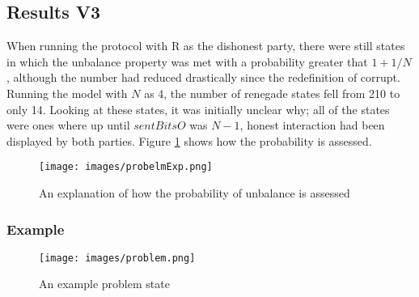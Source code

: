 \documentclass{l4proj}
\begin{document}
\subsection{Results V3}



When running the protocol with R as the dishonest party, there were still states in which the unbalance property was met with a probability greater that $1+1/N$, although the number had reduced drastically since the redefinition of corrupt. Running the model with $N$ as 4, the number of renegade states fell from 210 to only 14. Looking at these states, it was initially unclear why; all of the states were ones where up until $sentBitsO$ was $N-1$, honest interaction had been displayed by both parties. Figure \ref{finalProblem} shows how the probability is assessed.

\begin{figure}[h!]
\centering
\texttt{[image: images/probelmExp.png]}
\caption{An explanation of how the probability of unbalance is assessed}
\label{finalProblem}
\end{figure}


\subsubsection{Example}

\begin{figure}[h!]
\centering
\texttt{[image: images/problem.png]}
\caption{An example problem state}
\label{problemState}
\end{figure}
\end{document}
